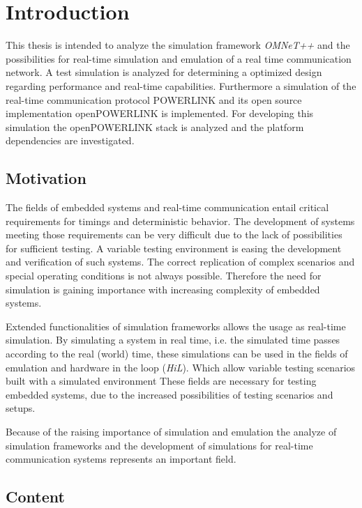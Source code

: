 \chapter{Introduction}
\label{cha:introduction}
This thesis is intended to analyze the simulation framework \emph{OMNeT++} \cite{omnet_manual} and the possibilities for real-time simulation and emulation of a real time communication network.
A test simulation is analyzed for determining a optimized design regarding performance and real-time capabilities.
Furthermore a simulation of the real-time communication protocol POWERLINK and its open source implementation \mbox{openPOWERLINK} \cite{openpowerlink} is implemented. 
For developing this simulation the openPOWERLINK stack is analyzed and the platform dependencies are investigated.

\section{Motivation}
The fields of embedded systems and real-time communication entail critical requirements for timings and deterministic behavior.
The development of systems meeting those requirements can be very difficult due to the lack of possibilities for sufficient testing.
A variable testing environment is easing the development and verification of such systems.
The correct replication of complex scenarios and special operating conditions is not always possible.
Therefore the need for simulation is gaining importance with increasing complexity of embedded systems.

Extended functionalities of simulation frameworks allows the usage as real-time simulation.
By simulating a system in real time, i.e. the simulated time passes according to the real (world) time, these simulations can be used in the fields of emulation and hardware in the loop (\emph{HiL}).
Which allow variable testing scenarios built with a simulated environment
These fields are necessary for testing embedded systems, due to the increased possibilities of testing scenarios and setups.

Because of the raising importance of simulation and emulation the analyze of simulation frameworks and the development of simulations for real-time communication systems represents an important field.

\section{Content}

